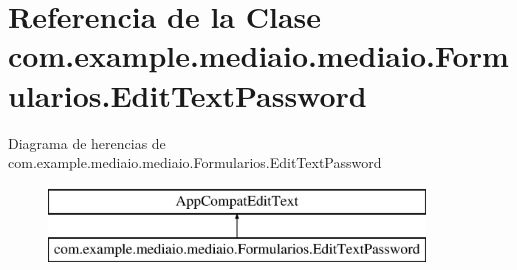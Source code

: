 \hypertarget{classcom_1_1example_1_1mediaio_1_1mediaio_1_1_formularios_1_1_edit_text_password}{}\section{Referencia de la Clase com.\+example.\+mediaio.\+mediaio.\+Formularios.\+Edit\+Text\+Password}
\label{classcom_1_1example_1_1mediaio_1_1mediaio_1_1_formularios_1_1_edit_text_password}
Diagrama de herencias de com.\+example.\+mediaio.\+mediaio.\+Formularios.\+Edit\+Text\+Password\begin{figure}[H]
\begin{center}
\leavevmode
\includegraphics[height=2.000000cm]{classcom_1_1example_1_1mediaio_1_1mediaio_1_1_formularios_1_1_edit_text_password}
\end{center}
\end{figure}
